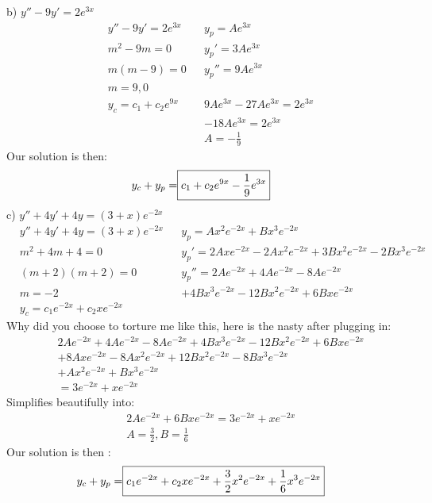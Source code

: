 \documentclass{article}
\begin{document}
b) $ y'' - 9y' = 2e^{3x }$
\begin{align*}
    & y'' - 9y' = 2e^{3x} && y_p = Ae^{3x}\\
    & m^2 - 9m = 0 && y_p' = 3Ae^{3x}\\
    & m(m-9) = 0 && y_p'' = 9Ae^{3x} \\
    & m = 9, 0 \\
    & y_c = c_1 + c_2e^{9x} && 9Ae^{3x} - 27Ae^{3x} = 2e^{3x} \\
    &&& -18Ae^{3x} = 2e^{3x} \\
    &&& A = -\frac{1}{9}
\end{align*}
Our solution is then:
\begin{align*}
    y_c + y_p = \Aboxed{c_1 + c_2e^{9x} - \frac{1}{9}e^{3x}}
\end{align*}
c) $ y'' + 4y' + 4y = (3+x)e^{-2x}$
\begin{align*}
    & y'' + 4y' + 4y = (3+x)e^{-2x} && y_p = Ax^2e^{-2x} + Bx^3e^{-2x}\\
    & m^2 + 4m + 4 = 0 && y_p' = 2Axe^{-2x} - 2Ax^2e^{-2x} + 3Bx^2e^{-2x} - 2Bx^3e^{-2x} \\
    & (m+2)(m+2) = 0 && y_p''= 2Ae^{-2x} + 4Ae^{-2x} - 8Ae^{-2x}\\
    & m = -2 && +4Bx^3e^{-2x} - 12Bx^2e^{-2x} + 6Bxe^{-2x} \\
    & y_c = c_1e^{-2x} + c_2xe^{-2x}
\end{align*}
Why did you choose to torture me like this, here is the nasty after plugging in:
\begin{align*}
    & 2Ae^{-2x} + 4Ae^{-2x} - 8Ae^{-2x} + 4Bx^3e^{-2x} - 12Bx^2e^{-2x} + 6Bxe^{-2x} \\
    & + 8Axe^{-2x} - 8Ax^2e^{-2x} + 12Bx^2e^{-2x} - 8Bx^3e^{-2x} \\
    & + Ax^2e^{-2x} + Bx^3e^{-2x} \\
    & = 3e^{-2x} + xe^{-2x}
\end{align*}
Simplifies beautifully into:
\begin{align*}
    & 2Ae^{-2x} + 6Bxe^{-2x} =  3e^{-2x} + xe^{-2x} \\
    & A = \frac{3}{2}, B = \frac{1}{6}
\end{align*}
Our solution is then :
\begin{align*}
    y_c + y_p = \Aboxed{c_1e^{-2x} + c_2xe^{-2x} + \frac{3}{2}x^2e^{-2x} + \frac{1}{6}x^3e^{-2x}}
\end{align*}
\end{document}
